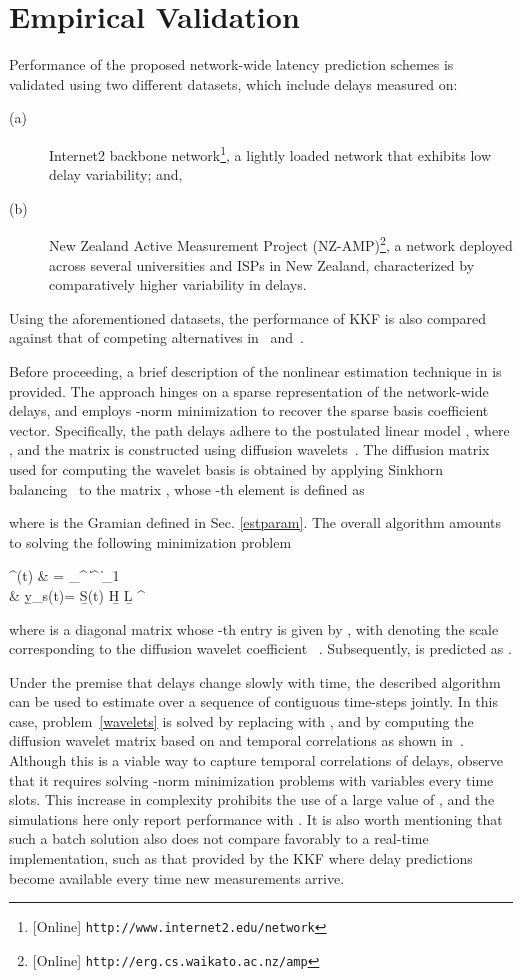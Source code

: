 \documentclass[draftcls,onecolumn,12pt]{IEEEtran}
\def \yst {{\b{y}_s(t)}}
\def \bbeta {{\bs{\beta}}}
\theoremstyle{plain}\newtheorem{thm}{Theorem}
\theoremstyle{definition}
\theoremstyle{remark}
\begin{document}
\section{Empirical Validation}\label{ev}
Performance of the proposed network-wide latency prediction schemes is validated using two different datasets, which include delays measured on: 
\begin{description}
	\item[(a)] Internet2 backbone network\footnote{[Online] \texttt{http://www.internet2.edu/network}}, a lightly loaded network that exhibits low delay variability; and, 
	\item[(b)] New Zealand Active Measurement Project (NZ-AMP)\footnote{[Online] \texttt{http://erg.cs.waikato.ac.nz/amp}}, a network deployed across several universities and ISPs in New Zealand, characterized by comparatively higher variability in delays.
\end{description}
Using the aforementioned datasets, the performance of KKF is also compared against that of competing alternatives in~\cite{nk} and~\cite{coates}. 

Before proceeding, a brief description of the nonlinear estimation technique in \cite{coates} is provided. The approach hinges on a sparse representation of the network-wide delays, and employs -norm minimization to recover the sparse basis coefficient vector. Specifically, the path delays adhere to the postulated linear model , where , and the matrix  is constructed using diffusion wavelets~\cite{Maggioni}. The diffusion matrix used for computing the wavelet basis is obtained by applying Sinkhorn balancing~\cite{sinkhorn} to the matrix , whose -th element is defined as 

where  is the Gramian defined in Sec. \ref{estparam}. The overall algorithm amounts to solving the following minimization problem 

\hat \bbeta^{\prime}(t) & = \arg \min_{\bbeta^{\prime}} \| \bbeta^{\prime} \|_1 \\
\hspace{0.5cm} & \yst = \b{S}(t) \b{H} \b{L} \bbeta^{\prime} 

where  is a diagonal matrix whose -th entry is given by , with  denoting the scale corresponding to the diffusion wavelet coefficient ~\cite{coates}. Subsequently,  is predicted as . 

Under the premise that delays change slowly with time, the described algorithm can be used to estimate  over a sequence of  contiguous time-steps jointly. In this case, problem~\eqref{wavelets} is solved by replacing  with , and by computing the  diffusion wavelet matrix based on  and temporal correlations as shown in~\cite{coates}. Although this is a viable way to capture temporal correlations of delays, observe that it requires solving -norm minimization problems with  variables every  time slots. 
This increase in complexity prohibits the use of a large value of , and the simulations here only report performance with .
It is also worth mentioning that such a batch solution also does not compare favorably to a real-time implementation, such as that provided by the KKF where delay predictions become available every time new measurements arrive. 
\end{document}
